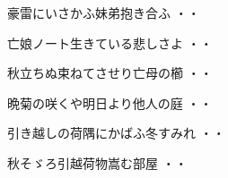 \begin{shiika}豪雷にいさかふ妹弟抱き合ふ
\hfill{・・}\end{shiika}
\begin{shiika}亡娘ノート生きている悲しさよ
\hfill{・・}\end{shiika}
\begin{shiika}秋立ちぬ束ねてさせり亡母の櫛
\hfill{・・}\end{shiika}
\begin{shiika}晩菊の咲くや明日より他人の庭
\hfill{・・}\end{shiika}
\begin{shiika}引き越しの荷隅にかばふ冬すみれ
\hfill{・・}\end{shiika}
\begin{shiika}秋そゞろ引越荷物嵩む部屋
\hfill{・・}\end{shiika}
\vspace{0.6cm}

